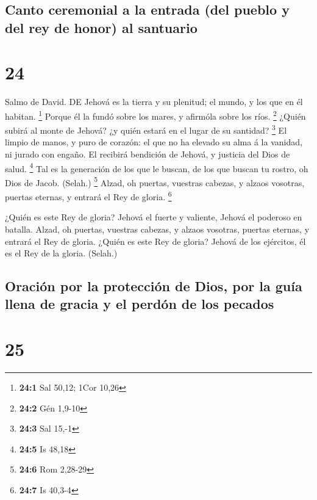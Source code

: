 \hypertarget{canto-ceremonial-a-la-entrada-del-pueblo-y-del-rey-de-honor-al-santuario}{%
\subsection{Canto ceremonial a la entrada (del pueblo y del rey de
honor) al
santuario}\label{canto-ceremonial-a-la-entrada-del-pueblo-y-del-rey-de-honor-al-santuario}}

\hypertarget{section-23}{%
\section{24}\label{section-23}}

 Salmo de David. DE Jehová es la tierra y su plenitud; el
mundo, y los que en él habitan. \footnote{\textbf{24:1} Sal 50,12; 1Cor
  10,26}  Porque él la fundó sobre los mares, y afirmóla
sobre los ríos. \footnote{\textbf{24:2} Gén 1,9-10}  ¿Quién
subirá al monte de Jehová? ¿y quién estará en el lugar de su santidad?
\footnote{\textbf{24:3} Sal 15,-1}  El limpio de manos, y
puro de corazón: el que no ha elevado su alma á la vanidad, ni jurado
con engaño.  El recibirá bendición de Jehová, y justicia del
Dios de salud. \footnote{\textbf{24:5} Is 48,18}  Tal es la
generación de los que le buscan, de los que buscan tu rostro, oh Dios de
Jacob. (Selah.) \footnote{\textbf{24:6} Rom 2,28-29}  Alzad,
oh puertas, vuestras cabezas, y alzaos vosotras, puertas eternas, y
entrará el Rey de gloria. \footnote{\textbf{24:7} Is 40,3-4}

 ¿Quién es este Rey de gloria? Jehová el fuerte y valiente,
Jehová el poderoso en batalla.  Alzad, oh puertas, vuestras
cabezas, y alzaos vosotras, puertas eternas, y entrará el Rey de gloria.
 ¿Quién es este Rey de gloria? Jehová de los ejércitos, él
es el Rey de la gloria. (Selah.)

\hypertarget{oraciuxf3n-por-la-protecciuxf3n-de-dios-por-la-guuxeda-llena-de-gracia-y-el-perduxf3n-de-los-pecados}{%
\subsection{Oración por la protección de Dios, por la guía llena de
gracia y el perdón de los
pecados}\label{oraciuxf3n-por-la-protecciuxf3n-de-dios-por-la-guuxeda-llena-de-gracia-y-el-perduxf3n-de-los-pecados}}

\hypertarget{section-24}{%
\section{25}\label{section-24}}

